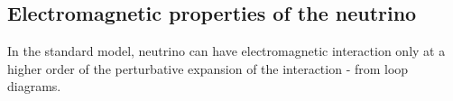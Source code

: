 
\subsection{Electromagnetic properties of the neutrino}


In the standard model, neutrino can have electromagnetic interaction only at a higher order of the perturbative expansion of the interaction - from loop diagrams. 

